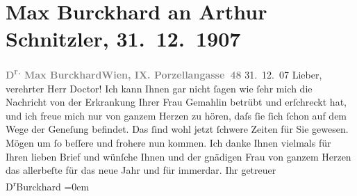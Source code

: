 

               \section[Max Burckhard an Arthur Schnitzler, 31. 12. 1907]{ Max Burckhard an Arthur Schnitzler, 31. 12. 1907}\nopagebreak{}\rehead{ }\begin{ledgroupsized}[t]{13cm}\normalsize\beginnumbering{} \toendnotes[C]{\smallbreak\pagebreak[2]} 
\toendnotes[C]{\smallbreak}\pstart
           \noindent{}{\pb}\textcolor{gray}{\textbf{D\textsuperscript{r.} Max Burckhard}}\hfill \textcolor{gray}{\textbf{Wien, IX. Porzellangasse 48}}{ }31. 12. 07\pend
           \pstart
           \raggedleft{}\textcolor{gray}{\textbf{}}\hspace*{3.5em}\pend
           \pstart{}Lieber, verehrter Herr Doctor!\pend\pstart
           Ich kann Ihnen gar nicht ſagen wie ſehr mich die Nachricht von der Erkrankung
                    Ihrer Frau Gemahlin betrübt
                    und erſchreckt hat, und ich freue mich nur von ganzem Herzen zu hören, daſs ſie
                    ſich ſchon auf dem Wege der Geneſung befindet. Das ſind wohl jetzt ſchwere
                    Zeiten {\pb}für Sie gewesen. Mögen um ſo
                    beſſere und frohere nun kommen.\pend
           \pstart
           Ich danke Ihnen vielmals für Ihren lieben Brief und wünſche Ihnen und der
                    gnädigen Frau von ganzem
                    Herzen das allerbeſte für das neue Jahr und für immerdar.\pend
           \pstart
           Ihr getreuer{\\[\baselineskip]}\spacefill\mbox{D\textsuperscript{r}Burckhard}\pend
           \leftskip=0em{}\endnumbering{}\end{ledgroupsized}  \newcommand{\dateiname}{L01747}\newcommand{\titel}{Max Burckhard an Arthur Schnitzler, 31. 12. 1907}\newcommand{\editorInnen}{Martin Anton Müller und Gerd-Hermann Susen}
      